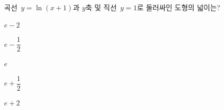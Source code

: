 \hspace*{2mm}\begin{minipage}[t]{\dimexpr\linewidth-2mm\relax}\vspace{0pt}
곡선~$y=\ln (x+1)$과 $y$축 및 직선~$y=1$로 둘러싸인 도형의 넓이는?
\begin{choices32}{\rule[-3ex]{0pt}{8ex}$e-2$}{\rule[-3ex]{0pt}{8ex}$e-\dfrac{1}{2}$}{\rule[-3ex]{0pt}{8ex}$e$}{\rule[-3ex]{0pt}{8ex}$e+\dfrac{1}{2}$}{\rule[-3ex]{0pt}{8ex}$e+2$}\end{choices32}\end{minipage}

